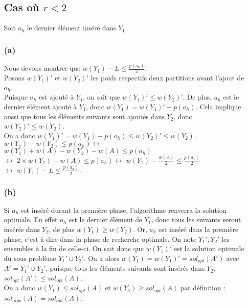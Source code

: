 \subsection{Cas où $r < 2$}\label{ex5_q2}
Soit $a_h$ le dernier \'el\'ement ins\'er\'e dans $Y_1$.\\

\subsubsection{(a)}\label{ex5_q2_a}
Nous devons montrer que $w(Y_1) - L \leq \frac{p(a_h)}{2}$.\\
Posons $w(Y_1)'$ et $w(Y_2)'$ les poids respectifs deux partitions avant l'ajout de
$a_h$.\\
Puisque $a_h$ est ajout\'e \`a $Y_1$, on sait que $w(Y_1)' \leq w(Y_2)'$.
De plus, $a_h$ est le dernier \'el\'ement ajout\'e \`a $Y_1$, donc $w(Y_1) = w(Y_1)' +
p(a_h)$.
Cela implique aussi que tous les \'el\'ements suivants sont ajoutés dans $Y_2$, donc
$w(Y_2)' \leq w(Y_2)$.\\
On a donc $w(Y_1)' = w(Y_1) - p(a_h) \leq w(Y_2)' \leq w(Y_2)$.\\
$w(Y_1) - w(Y_2) \leq p(a_h) \leftrightarrow$
$w(Y_1) + w(A) - w(Y_2) - w(A) \leq p(a_h)$\\
$\leftrightarrow$
$2 \times w(Y_1) - w(A) \leq p(a_h) \leftrightarrow$
$w(Y_1) - \frac{w(A)}{2} \leq \frac{p(a_h)}{2}$\\
$\leftrightarrow$
$w(Y_1) - L \leq \frac{p(a_h)}{2}$.

\subsubsection{(b)}\label{ex5_q2_b}
Si $a_h$ est ins\'er\'e durant la première phase, l'algorithme renverra la solution
optimale. En effet $a_h$ est le dernier élément de $Y_1$, donc tous les suivants seront
insérés dans $Y_2$, de plus $w(Y_1) \geq w(Y_2)$.
Or, $a_h$ est inséré dans la première phase, c'est à dire dans la phase de recherche
optimale. On note $Y_1',Y_2'$ les ensembles à la fin de celle-ci.
On sait donc que $w(Y_1)'$ est la solution optimale du sous problème $Y_1' \cup
Y_2'$.
On a alors $w(Y_1) = w(Y_1)' = sol_{opt}(A')$ avec $A' = Y_1' \cup Y_2'$, puisque tous
les éléments suivants sont insérés dans $Y_2$, $sol_{opt}(A') \leq sol_{opt}(A)$.\\
On a donc $w(Y_1) \leq sol_{opt}(A)$ et $w(Y_1) \geq sol_{opt}(A)$ par définition :
$sol_{algo}(A) = sol_{opt}(A)$.

